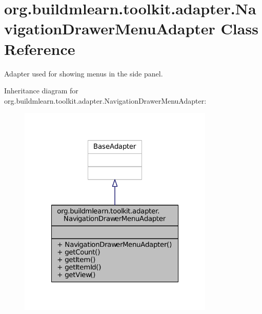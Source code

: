 \hypertarget{classorg_1_1buildmlearn_1_1toolkit_1_1adapter_1_1NavigationDrawerMenuAdapter}{\section{org.\-buildmlearn.\-toolkit.\-adapter.\-Navigation\-Drawer\-Menu\-Adapter Class Reference}
\label{classorg_1_1buildmlearn_1_1toolkit_1_1adapter_1_1NavigationDrawerMenuAdapter}
}


Adapter used for showing menus in the side panel.  




Inheritance diagram for org.\-buildmlearn.\-toolkit.\-adapter.\-Navigation\-Drawer\-Menu\-Adapter\-:
\nopagebreak
\begin{figure}[H]
\begin{center}
\leavevmode
\includegraphics[width=264pt]{de/d9a/classorg_1_1buildmlearn_1_1toolkit_1_1adapter_1_1NavigationDrawerMenuAdapter__inherit__graph}
\end{center}
\end{figure}


